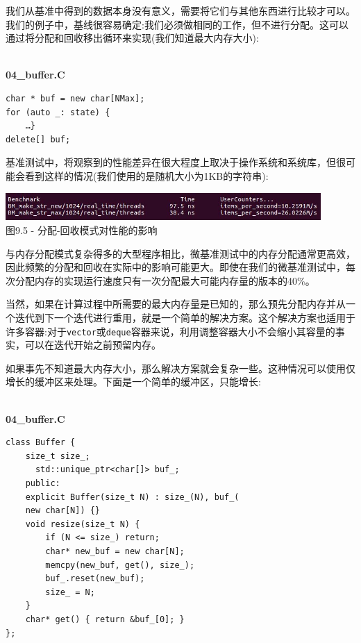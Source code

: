 我们从基准中得到的数据本身没有意义，需要将它们与其他东西进行比较才可以。我们的例子中，基线很容易确定:我们必须做相同的工作，但不进行分配。这可以通过将分配和回收移出循环来实现(我们知道最大内存大小):

\hspace*{\fill} \\ %
\noindent
\textbf{04\_buffer.C}
\begin{lstlisting}[style=styleCXX]
char * buf = new char[NMax];
for (auto _: state) {
	…}
delete[] buf;
\end{lstlisting}

基准测试中，将观察到的性能差异在很大程度上取决于操作系统和系统库，但很可能会看到这样的情况(我们使用的是随机大小为1KB的字符串):

\begin{center}
\includegraphics[width=0.9\textwidth]{content/3/chapter9/images/5.jpg}\\
图9.5 - 分配-回收模式对性能的影响
\end{center}

与内存分配模式复杂得多的大型程序相比，微基准测试中的内存分配通常更高效，因此频繁的分配和回收在实际中的影响可能更大。即使在我们的微基准测试中，每次分配内存的实现运行速度只有一次分配最大可能内存量的版本的40\%。 

当然，如果在计算过程中所需要的最大内存量是已知的，那么预先分配内存并从一个迭代到下一个迭代进行重用，就是一个简单的解决方案。这个解决方案也适用于许多容器:对于\texttt{vector}或\texttt{deque}容器来说，利用调整容器大小不会缩小其容量的事实，可以在迭代开始之前预留内存。

如果事先不知道最大内存大小，那么解决方案就会复杂一些。这种情况可以使用仅增长的缓冲区来处理。下面是一个简单的缓冲区，只能增长:

\hspace*{\fill} \\ %
\noindent
\textbf{04\_buffer.C}
\begin{lstlisting}[style=styleCXX]
class Buffer {
	size_t size_;
	  std::unique_ptr<char[]> buf_;
	public:
	explicit Buffer(size_t N) : size_(N), buf_(
	new char[N]) {}
	void resize(size_t N) { 
		if (N <= size_) return;
		char* new_buf = new char[N];
		memcpy(new_buf, get(), size_);
		buf_.reset(new_buf);
		size_ = N;
	}
	char* get() { return &buf_[0]; }
};
\end{lstlisting}

